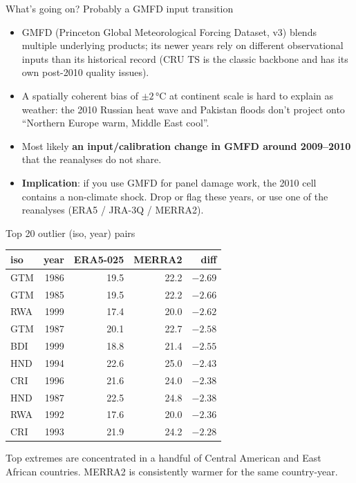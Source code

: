 \documentclass[10pt,aspectratio=169]{beamer}
\begin{document}
\begin{frame}{What's going on? Probably a GMFD input transition}
  \begin{itemize}
    \item GMFD (Princeton Global Meteorological Forcing Dataset, v3) blends
          multiple underlying products; its newer years rely on different
          observational inputs than its historical record (CRU TS is the
          classic backbone and has its own post-2010 quality issues).
    \item A spatially coherent bias of $\pm 2$\,°C at continent scale
          is hard to explain as weather: the 2010 Russian heat wave and
          Pakistan floods don't project onto ``Northern Europe warm,
          Middle East cool''.
    \item Most likely \textbf{an input/calibration change in GMFD around
          2009--2010} that the reanalyses do not share.
    \item \textbf{Implication}: if you use GMFD for panel damage work, the
          2010 cell contains a non-climate shock. Drop or flag these years,
          or use one of the reanalyses (ERA5 / JRA-3Q / MERRA2).
  \end{itemize}
\end{frame}

\begin{frame}{Top 20 outlier (iso, year) pairs}
  \centering
  \scriptsize
  \begin{tabular}{l r r r r}
    \toprule
    iso & year & ERA5-025 & MERRA2 & diff \\
    \midrule
    GTM & 1986 & 19.5 & 22.2 & $-2.69$ \\
    GTM & 1985 & 19.5 & 22.2 & $-2.66$ \\
    RWA & 1999 & 17.4 & 20.0 & $-2.62$ \\
    GTM & 1987 & 20.1 & 22.7 & $-2.58$ \\
    BDI & 1999 & 18.8 & 21.4 & $-2.55$ \\
    HND & 1994 & 22.6 & 25.0 & $-2.43$ \\
    CRI & 1996 & 21.6 & 24.0 & $-2.38$ \\
    HND & 1987 & 22.5 & 24.8 & $-2.38$ \\
    RWA & 1992 & 17.6 & 20.0 & $-2.36$ \\
    CRI & 1993 & 21.9 & 24.2 & $-2.28$ \\
    \bottomrule
  \end{tabular}

  \vspace{0.4em}
  \footnotesize
  Top extremes are concentrated in a handful of Central American and East
  African countries. MERRA2 is consistently warmer for the same country-year.
\end{frame}
\end{document}
